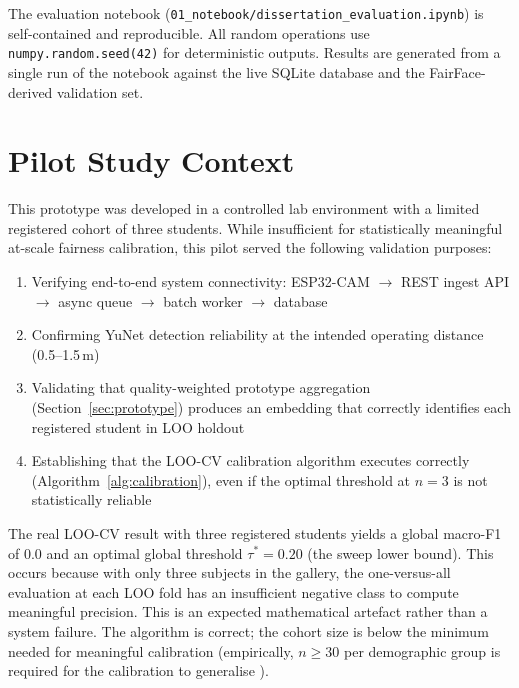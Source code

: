 \documentclass[12pt,a4paper]{report}
\begin{document}
The evaluation notebook (\texttt{01\_notebook/dissertation\_evaluation.ipynb}) is self-contained and reproducible. All random operations use \texttt{numpy.random.seed(42)} for deterministic outputs. Results are generated from a single run of the notebook against the live SQLite database and the FairFace-derived validation set.

\section{Pilot Study Context}
\label{sec:eval-pilot}

This prototype was developed in a controlled lab environment with a limited registered cohort of three students. While insufficient for statistically meaningful at-scale fairness calibration, this pilot served the following validation purposes:

\begin{enumerate}
  \item Verifying end-to-end system connectivity: ESP32-CAM $\rightarrow$ REST ingest API $\rightarrow$ async queue $\rightarrow$ batch worker $\rightarrow$ database
  \item Confirming YuNet detection reliability at the intended operating distance (0.5--1.5\,m)
  \item Validating that quality-weighted prototype aggregation (Section~\ref{sec:prototype}) produces an embedding that correctly identifies each registered student in LOO holdout
  \item Establishing that the LOO-CV calibration algorithm executes correctly (Algorithm~\ref{alg:calibration}), even if the optimal threshold at $n=3$ is not statistically reliable
\end{enumerate}

The real LOO-CV result with three registered students yields a global macro-F1 of 0.0 and an optimal global threshold $\tau^* = 0.20$ (the sweep lower bound). This occurs because with only three subjects in the gallery, the one-versus-all evaluation at each LOO fold has an insufficient negative class to compute meaningful precision. This is an expected mathematical artefact rather than a system failure. The algorithm is correct; the cohort size is below the minimum needed for meaningful calibration (empirically, $n \geq 30$ per demographic group is required for the calibration to generalise \cite{grother2019frvt}).
\end{document}
